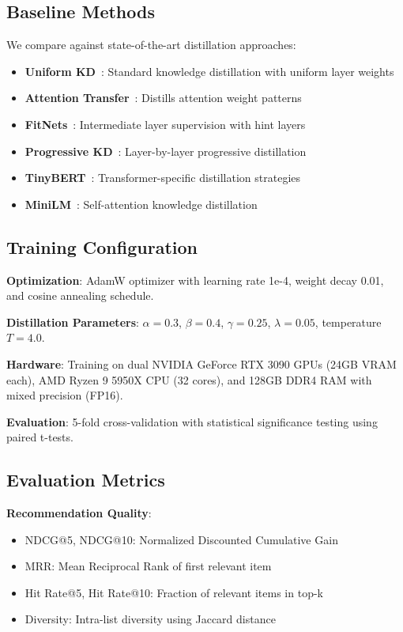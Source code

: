\documentclass[10pt,conference]{IEEEtran}
\begin{document}
\subsection{Baseline Methods}

We compare against state-of-the-art distillation approaches:

\begin{itemize}[leftmargin=*]
    \item \textbf{Uniform KD}~\cite{hinton2015distilling}: Standard knowledge distillation with uniform layer weights
    \item \textbf{Attention Transfer}~\cite{zagoruyko2016attention}: Distills attention weight patterns
    \item \textbf{FitNets}~\cite{romero2014fitnets}: Intermediate layer supervision with hint layers
    \item \textbf{Progressive KD}~\cite{sun2019patient}: Layer-by-layer progressive distillation
    \item \textbf{TinyBERT}~\cite{jiao2019tinybert}: Transformer-specific distillation strategies
    \item \textbf{MiniLM}~\cite{wang2020minilm}: Self-attention knowledge distillation
\end{itemize}

\subsection{Training Configuration}

\textbf{Optimization}: AdamW optimizer with learning rate 1e-4, weight decay 0.01, and cosine annealing schedule.

\textbf{Distillation Parameters}: $\alpha=0.3$, $\beta=0.4$, $\gamma=0.25$, $\lambda=0.05$, temperature $T=4.0$.

\textbf{Hardware}: Training on dual NVIDIA GeForce RTX 3090 GPUs (24GB VRAM each), AMD Ryzen 9 5950X CPU (32 cores), and 128GB DDR4 RAM with mixed precision (FP16).

\textbf{Evaluation}: 5-fold cross-validation with statistical significance testing using paired t-tests.

\subsection{Evaluation Metrics}

\textbf{Recommendation Quality}:
\begin{itemize}[leftmargin=*]
    \item NDCG@5, NDCG@10: Normalized Discounted Cumulative Gain
    \item MRR: Mean Reciprocal Rank of first relevant item
    \item Hit Rate@5, Hit Rate@10: Fraction of relevant items in top-k
    \item Diversity: Intra-list diversity using Jaccard distance
\end{itemize}
\end{document}
